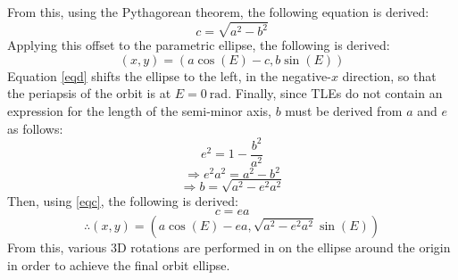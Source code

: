 \documentclass[conference]{IEEEtran}
\begin{document}
			From this, using the Pythagorean theorem, the following equation is derived:
			\begin{equation}
				c=\sqrt{a^2-b^2}
				\label{eqc}
			\end{equation}
			Applying this offset to the parametric ellipse, the following is derived:
			\begin{equation}
				\left(x,y\right)=\left(a\cos{\left(E\right)}-c,b\sin{\left(E\right)}\right)
				\label{eqd}
			\end{equation}
			Equation \eqref{eqd} shifts the ellipse to the left, in the negative-\( x \) direction, so that the periapsis of the orbit is at \( E=\qty{0}{\radian} \). Finally, since TLEs do not contain an expression for the length of the semi-minor axis, \( b \) must be derived from \( a \) and \( e \) as follows:
			\begin{equation}
				e^2=1-\frac{b^2}{a^2}
			\end{equation}
			\begin{equation}
				\Rightarrow e^2 a^2=a^2-b^2
			\end{equation}
			\begin{equation}
				\Rightarrow b=\sqrt{a^2-e^2 a^2}
			\end{equation}
			Then, using \eqref{eqc}, the following is derived:
			\begin{equation}
				c=ea
			\end{equation}
			\begin{equation}
				\therefore \left(x,y\right)=\left(a\cos{\left(E\right)}-ea,\sqrt{a^2-e^2 a^2}\sin{\left(E\right)}\right)
			\end{equation}
			From this, various 3D rotations are performed in on the ellipse around the origin in order to achieve the final orbit ellipse.
\end{document}
